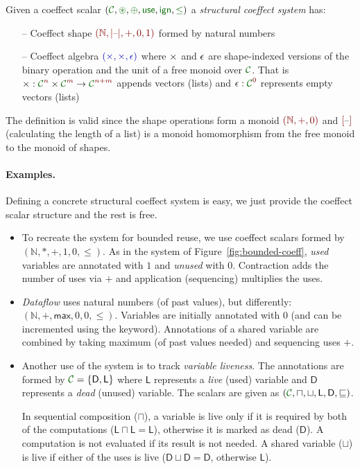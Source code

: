 \begin{definition}
Given a coeffect scalar $(\C, \cseq, \cpar, \cunit, \czero, \cleq)$ a \emph{structural
coeffect system} has: 
\begin{itemize}{}
\item[--] Coeffect shape $\sclrd{(\mathbb{N}, {|}\textnormal{--}{|}, +, 0, 1)}$ formed by natural numbers
\item[--] Coeffect algebra $\aclrd{(\fcons, \fcons, \fempty)}$ where $\times$ and $\epsilon$ are
  shape-indexed versions of the binary operation and the unit of a free monoid over $\C$.
  That is $\fcons : \C^{\sclrd{n}} \times \C^{\sclrd{m}} \rightarrow \C^{\sclrd{n + m}}$ appends vectors
  (lists) and $\fempty : \C^{\sclrd{0}}$ represents empty vectors (lists)
\end{itemize}
\end{definition}

\noindent
The definition is valid since the shape operations form a monoid
$\sclrd{(\mathbb{N}, +, 0)}$ and $\mksh{\textnormal{--}}$ (calculating the length of
a list) is a monoid homomorphism from the free monoid to the monoid of
shapes.

\paragraph{Examples.} 
Defining a concrete structural coeffect system is easy, we just provide the coeffect scalar structure and the rest is free.

\begin{itemize}
\item
To recreate the system for bounded reuse, we use coeffect scalars formed by
$(\mathbb{N}, \ast, +, 1, 0, \leq)$. As in the system of Figure~\ref{fig:bounded-coeff},
\emph{used} variables are annotated with $1$ and \emph{unused} with $0$. Contraction adds the number
of uses via $+$ and application (sequencing) multiplies the uses.

\item
\emph{Dataflow} uses natural numbers (of past values), but differently: $(\mathbb{N}, +, \mathsf{max}, 0, 0, \leq)$.
Variables are initially annotated with $0$ (and can be incremented using the  keyword).
Annotations of a shared variable are combined by taking maximum (of past values needed) and
sequencing uses $+$.

\item
Another use of the system is to track \emph{variable liveness}. The annotations are formed by
$\C=\{ \mathsf{D}, \mathsf{L} \}$ where $\mathsf{L}$ represents a \emph{live} (used) variable
and $\mathsf{D}$ represents a \emph{dead} (unused) variable. The scalars are given as
$(\C, \sqcap, \sqcup, \mathsf{L}, \mathsf{D}, \sqsubseteq)$. 

In sequential composition ($\sqcap$), a variable is live only if it is required by both of the 
computations ($\mathsf{L} \sqcap \mathsf{L} = \mathsf{L}$), otherwise it is marked as 
dead ($\mathsf{D}$). A computation is not evaluated if its result is not needed.
A shared variable ($\sqcup$) is live if either of the uses is live 
($\mathsf{D} \sqcup \mathsf{D} = \mathsf{D}$, otherwise $\mathsf{L}$).
\end{itemize}

